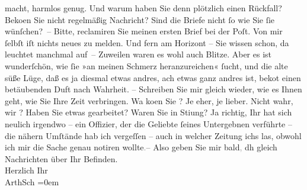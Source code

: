 \begin{ledgroupsized}[t]{13cm}
               macht, harmlos genug. Und warum haben Sie denn plötzlich einen Rückfall? Beko{\geminationm}en­ Sie nicht regelmäßig Nachricht? {\pb}Sind die Briefe nicht ſo wie Sie ſie
               wünſchen? – Bitte, reclamiren Sie meinen ersten Brief bei der Poſt. Von mir ſelbſt
               iſt nichts neues zu melden. Und fern am Horizont – Sie wissen schon, da leuchtet {\pb}\label{K_L02951-2v}\label{K_L02951-2h} manchmal
                  auf{\dotstwo} – Zuweilen waren es wohl auch Blitze. Aber es ist
               wunderſchön, wie ſie »an meinen Schmerz heranzureichen« ſucht, und die alte süße
               Lüge, daß es ja diesmal etwas andres, ach etwas ganz andres ist, beko{\geminationm}t {\pb}einen
               betäubenden Duft nach Wahrheit. – Schreiben Sie mir gleich wieder, wie es Ihnen geht,
               wie Sie Ihre Zeit verbringen. Wa{\geminationn} ko{\geminationm}en Sie \label{K_L02951-3v}\label{K_L02951-3h}? Je eher, je lieber. Nicht wahr, wir \label{K_L02951-4v}\label{K_L02951-4h}? Haben {\pb}Sie etwas gearbeitet? Waren Sie in Sti{\geminationm}ung? Ja richtig, Ihr \label{K_L02951-5v}\label{K_L02951-5h} hat sich neulich
               irgendwo \label{K_L02951-6v}\label{K_L02951-6h} – ein
               Offizier, der die Geliebte ſeines Untergebnen verführte – die nähern Umſtände hab ich
               vergeſſen – auch {\pb}in welcher Zeitung ichs
               las, obwohl ich mir die Sache genau notiren wollte\textcolor{gray}{.}– \pend
           \pstart
           Also geben Sie mir bald\textcolor{gray}{,} dh gleich Nachrichten über Ihr
               Befinden. {\\[\baselineskip]}Herzlich Ihr {\\[\baselineskip]}\spacefill\mbox{ArthSch}\pend
           \leftskip=0em{}
         

\end{ledgroupsized}
